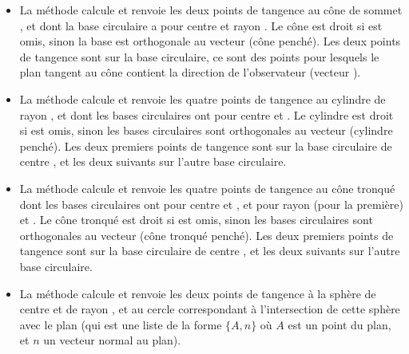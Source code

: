 \begin{itemize}
    \item La méthode  calcule et renvoie les deux points de tangence au cône de sommet ,  et dont la base circulaire a pour centre  et rayon . Le cône est droit si  est omis, sinon la base est orthogonale au vecteur  (cône penché). Les deux points de tangence sont sur la base circulaire, ce sont des points pour lesquels le plan tangent au cône contient la direction de l'observateur (vecteur ).
    
    \item La méthode  calcule et renvoie les quatre points de tangence au cylindre de rayon , et dont les bases circulaires ont pour centre  et . Le cylindre est droit si  est omis, sinon les bases circulaires sont orthogonales au vecteur  (cylindre penché). Les deux premiers points de tangence sont sur la base circulaire de centre , et les deux suivants sur l'autre base circulaire.
    
    \item La méthode  calcule et renvoie les quatre points de tangence au cône tronqué dont les bases circulaires ont pour centre  et , et pour rayon  (pour la première) et . Le cône tronqué est droit si  est omis, sinon les bases circulaires sont orthogonales au vecteur  (cône tronqué penché). Les deux premiers points de tangence sont sur la base circulaire de centre , et les deux suivants sur l'autre base circulaire.
    
    \item La méthode  calcule et renvoie les deux points de tangence à la sphère de centre  et de rayon , et au cercle correspondant à l'intersection de cette sphère avec le plan  (qui est une liste de la forme $\{A,n\}$ où $A$ est un point du plan, et $n$ un vecteur normal au plan).
\end{itemize}

